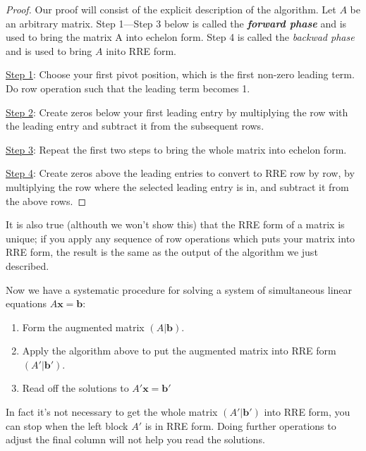 \documentclass[12pt]{report}
\theoremstyle{definition}
\begin{document}
\begin{proof}
    Our proof will consist of the explicit description of the algorithm.
    Let $A$ be an arbitrary matrix.
    Step 1---Step 3 below is called the \textbf{\emph{forward phase}}
    and is used to bring the matrix A into echelon form.
    Step 4 is called the \emph{backwad phase}
    and is used to bring $A$ inito RRE form.

    \underline{Step 1}: Choose your first pivot position,
    which is the first non-zero leading term. Do row operation
    such that the leading term becomes 1.

    \underline{Step 2}: Create zeros below your first leading entry by
    multiplying the row with the leading entry and subtract it from the subsequent rows.

    \underline{Step 3}: Repeat the first two steps to bring the whole matrix into echelon form.

    \underline{Step 4}: Create zeros above the leading entries to convert to RRE row by row,
    by multiplying the row where the selected leading entry is in, and subtract it from the above rows.

\end{proof}

    \medskip
    It is also true (althouth we won't show this) that the RRE form of a matrix is unique;
    if you apply any sequence of row operations which puts your matrix into RRE form,
    the result is the same as the output of the algorithm we just described.

    Now we have a systematic procedure for solving a system of simultaneous linear equations
    $A\mathbf{x} = \mathbf{b}$:
    \begin{enumerate}[label = (\arabic*)]
        \item Form the augmented matrix $(A|\mathbf{b})$.
        \item Apply the algorithm above to put the augmented matrix into RRE form $(A'|\mathbf{b}')$.
        \item Read off the solutions to $A'\mathbf{x} = \mathbf{b}'$
    \end{enumerate}
    
    In fact it's not necessary to get the whole matrix $(A'|\mathbf{b}')$ into RRE form, 
    you can stop when the left block $A'$ is in RRE form. Doing further operations to adjust
    the final column will not help you read the solutions.
\end{document}
